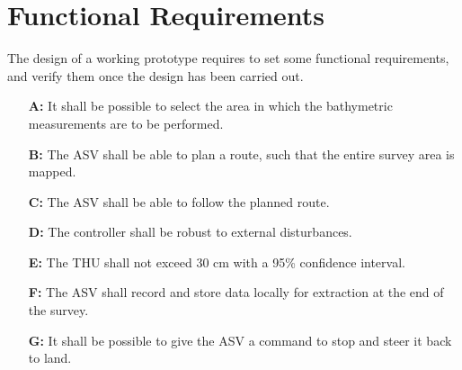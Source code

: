 \section{Functional Requirements} \label{sec:requirements}
The design of a working prototype requires to set some functional requirements, and verify them once the design has been carried out.
%
\begin{itemize}
  \item[\textbf{A:}] It shall be possible to select the area in which the bathymetric measurements are to be performed.
  \item[\textbf{B:}] The ASV shall be able to plan a route, such that the entire survey area is mapped.
  \item[\textbf{C:}] The ASV shall be able to follow the planned route.
  \item[\textbf{D:}] The controller shall be robust to external disturbances.
  \item[\textbf{E:}] The THU shall not exceed 30 cm with a 95\% confidence interval.
  \item[\textbf{F:}] The ASV shall record and store data locally for extraction at the end of the survey.
  \item[\textbf{G:}] It shall be possible to give the ASV a command to stop and steer it back to land.
\end{itemize}
%







